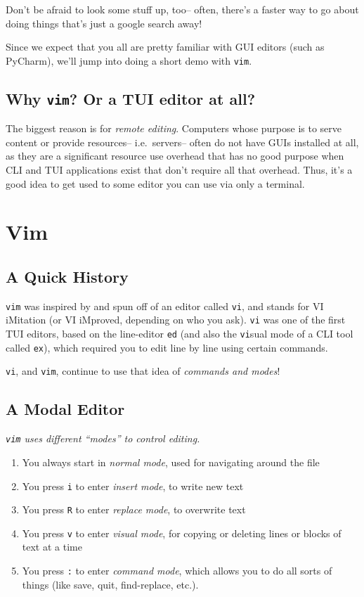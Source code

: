 Don't be afraid to look some stuff up, too-- often, there's a faster way to go
about doing things that's just a google search away!

Since we expect that you all are pretty familiar with GUI editors (such as 
PyCharm), we'll jump into doing a short demo with {\tt vim}.

\subsection{Why {\tt vim}? Or a TUI editor at all?}

The biggest reason is for {\em remote editing}. Computers whose purpose is to
serve content or provide resources-- i.e.\ servers-- often do not have GUIs
installed at all, as they are a significant resource use overhead that has no
good purpose when CLI and TUI applications exist that don't require all that
overhead. Thus, it's a good idea to get used to some editor you can use via
only a terminal.

\section{Vim}

\subsection{A Quick History}

{\tt vim} was inspired by and spun off of an editor called {\tt vi}, and stands
for VI iMitation (or VI iMproved, depending on who you ask). {\tt vi} was one
of the first TUI editors, based on the line-editor {\tt ed} (and also the {\tt vi}sual
mode of a CLI tool called {\tt ex}), which required you to edit line by line using
certain commands.

{\tt vi}, and {\tt vim}, continue to use that idea of {\em commands and modes}!

\subsection{A Modal Editor}

{\em {\tt vim} uses different ``modes'' to control editing.}

\begin{enumerate}
  \item You always start in {\em normal mode}, used for navigating around the file
  \item You press {\tt i} to enter {\em insert mode}, to write new text
  \item You press {\tt R} to enter {\em replace mode}, to overwrite text
  \item You press {\tt v} to enter {\em visual mode}, for copying or deleting lines or blocks of text at a time
  \item You press {\tt :} to enter {\em command mode}, which allows you to do all sorts of things (like save, quit, find-replace, etc.).
\end{enumerate}

